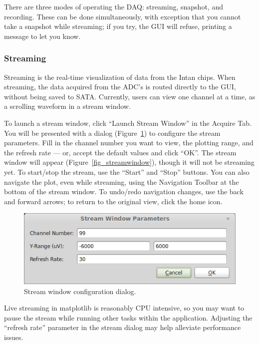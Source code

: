 There are three modes of operating the DAQ: streaming, snapshot, and recording. These can be done simultaneously, with exception that you cannot take a snapshot while streaming; if you try, the GUI will refuse, printing a message to let you know.

\subsubsection{Streaming}
\label{sec_usage_acquire_streaming}

Streaming is the real-time visualization of data from the Intan chips. When streaming, the data acquired from the ADC's is routed directly to the GUI, without being saved to SATA. Currently, users can view one channel at a time, as a scrolling waveform in a stream window.

To launch a stream window, click ``Launch Stream Window'' in the Acquire Tab. You will be presented with a dialog (Figure~\ref{fig_streamdialog}) to configure the stream parameters. Fill in the channel number you want to view, the plotting range, and the refresh rate --- or, accept the default values and click ``OK''. The stream window will appear (Figure~\ref{fig_streamwindow}), though it will not be streaming yet. To start/stop the stream, use the ``Start'' and ``Stop'' buttons. You can also navigate the plot, even while streaming, using the Navigation Toolbar at the bottom of the stream window. To undo/redo navigation changes, use the back and forward arrows; to return to the original view, click the home icon.

\begin{figure}[h!]
\begin{center}
\includegraphics[width=12cm]{screenshots/streamdialog.png}
\end{center}
\caption{Stream window configuration dialog.}
\label{fig_streamdialog}
\end{figure}

Live streaming in matplotlib is reasonably CPU intensive, so you may want to pause the stream while running other tasks within the application. Adjusting the ``refresh rate'' parameter in the stream dialog may help alleviate performance issues.

